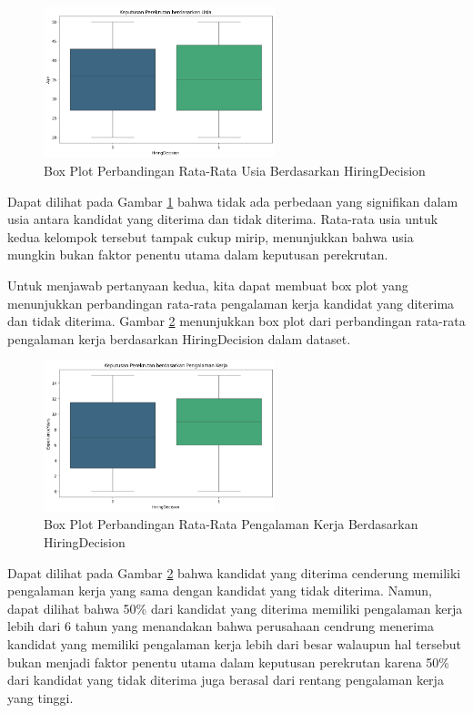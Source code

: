 \begin{figure}[H]
    \centering
    \includegraphics[width=0.6\textwidth]{gambar/usia.png}
    \caption{Box Plot Perbandingan Rata-Rata Usia Berdasarkan HiringDecision}
    \label{fig:usia}
\end{figure}

Dapat dilihat pada Gambar \ref{fig:usia} bahwa tidak ada perbedaan yang signifikan dalam usia antara kandidat yang diterima dan tidak diterima. Rata-rata usia untuk kedua kelompok tersebut tampak cukup mirip, menunjukkan bahwa usia mungkin bukan faktor penentu utama dalam keputusan perekrutan.

Untuk menjawab pertanyaan kedua, kita dapat membuat box plot yang menunjukkan perbandingan rata-rata pengalaman kerja kandidat yang diterima dan tidak diterima. Gambar \ref{fig:exp} menunjukkan box plot dari perbandingan rata-rata pengalaman kerja berdasarkan HiringDecision dalam dataset.

\begin{figure}[H]
    \centering
    \includegraphics[width=0.6\textwidth]{gambar/exp.png}
    \caption{Box Plot Perbandingan Rata-Rata Pengalaman Kerja Berdasarkan HiringDecision}
    \label{fig:exp}
\end{figure}

Dapat dilihat pada Gambar \ref{fig:exp} bahwa kandidat yang diterima cenderung memiliki pengalaman kerja yang sama dengan kandidat yang tidak diterima. Namun, dapat dilihat bahwa 50\% dari kandidat yang diterima memiliki pengalaman kerja lebih dari 6 tahun yang menandakan bahwa perusahaan cendrung menerima kandidat yang memiliki pengalaman kerja lebih dari besar walaupun hal tersebut bukan menjadi faktor penentu utama dalam keputusan perekrutan karena 50\% dari kandidat yang tidak diterima juga berasal dari rentang pengalaman kerja yang tinggi.

